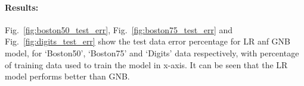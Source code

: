 \paragraph{Results:} Fig.~\ref{fig:boston50_test_err}, Fig.~\ref{fig:boston75_test_err} and Fig.~\ref{fig:digits_test_err} show the test data error percentage for LR anf GNB model, for `Boston50', `Boston75' and `Digits' data respectively, with percentage of training data used to train the model in x-axis. It can be seen that the LR model performs better than GNB.
\begin{figure}[h]
	\centering
	\hspace*{0.5cm}
	\\

\end{figure}
